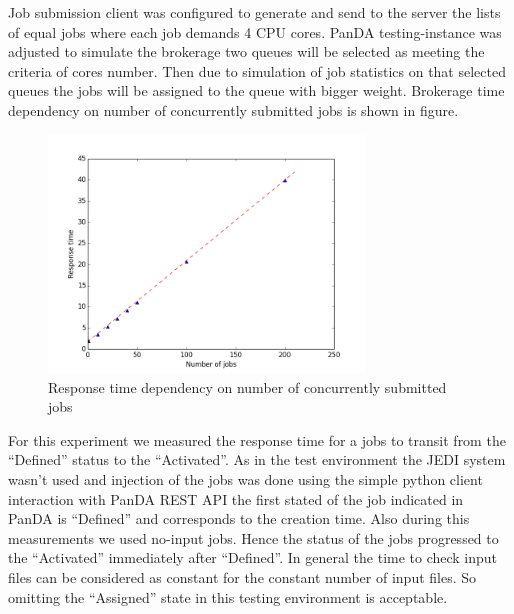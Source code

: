 Job submission client was configured to generate and send to the server the
lists of equal jobs where each job demands 4 CPU cores. PanDA testing-instance
was adjusted to simulate the brokerage two queues will be selected as meeting
the criteria of cores number. Then due to simulation of job statistics on that
selected queues the jobs will be assigned to the queue with bigger weight.
Brokerage time dependency on number of concurrently submitted jobs is shown in
figure.


\begin{figure}
  \includegraphics[width=0.75\textwidth]{images/Fig2.png}
\caption{Response time dependency on number of concurrently submitted jobs}
\label{fig:brokeragescaling}
\end{figure}

For this experiment we measured the response time for a jobs to transit from the
``Defined'' status to the ``Activated''. As in the test environment the JEDI
system wasn't used and injection of the jobs was done using the simple python
client interaction with PanDA REST API the first stated of the job indicated in
PanDA is ``Defined'' and corresponds to the creation time. Also during this
measurements we used no-input jobs. Hence the status of the jobs progressed to
the ``Activated'' immediately after ``Defined''. In general the time to check
input files can be considered as constant for the constant number of input
files. So omitting the ``Assigned'' state in this testing environment is
acceptable. 



